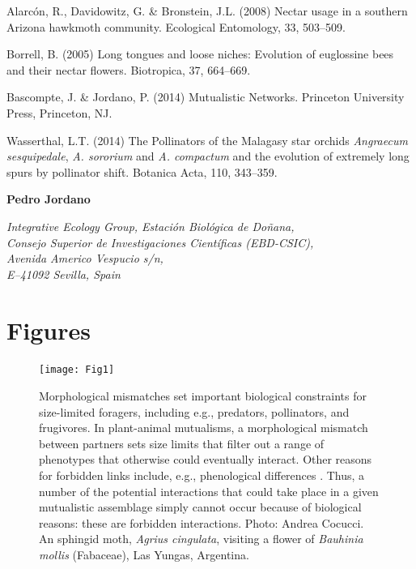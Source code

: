 \documentclass[a4paper,12pt]{article}
\begin{document}
\begin{thebibliography}{10}
Alarcón, R., Davidowitz, G. \& Bronstein, J.L. (2008) Nectar usage in a southern Arizona hawkmoth community. Ecological Entomology, 33, 503–509.

Borrell, B. (2005) Long tongues and loose niches: Evolution of euglossine bees and their nectar flowers. Biotropica, 37, 664–669.

Bascompte, J. \& Jordano, P. (2014) Mutualistic Networks. Princeton University Press, Princeton, NJ.

Wasserthal, L.T. (2014) The Pollinators of the Malagasy star orchids \textit{Angraecum sesquipedale}, \textit{A. sororium} and \textit{A. compactum} and the evolution of extremely long spurs by pollinator shift. Botanica Acta, 110, 343–359.

\end{thebibliography}


\begin{flushright}
  \noindent 
  		\textbf{Pedro Jordano }\\
  		\begin{spacing}{1.0}
		\textit{Integrative Ecology Group, Estaci\'on Biol\'ogica de Do\~nana, \\ Consejo Superior de Investigaciones Cient\'ificas (EBD-CSIC), \\ Avenida Americo Vespucio s\slash n, \\ E--41092 Sevilla, Spain}
		\end{spacing}
\end{flushright}
\newpage

\pagestyle{empty}
\section*{Figures}


\begin{figure}[h!]
  \caption{Morphological mismatches set important biological constraints for size-limited foragers, including e.g., predators, pollinators, and frugivores. In plant-animal mutualisms, a morphological mismatch between partners sets size limits that filter out a range of phenotypes that otherwise could eventually interact. Other reasons for forbidden links include, e.g., phenological differences \citep{BasJor:2014}. Thus, a number of the potential interactions that could take place in a given mutualistic assemblage simply cannot occur because of biological reasons: these are forbidden interactions. Photo: Andrea Cocucci. An sphingid moth, \textit{Agrius cingulata}, visiting a flower of \textit{Bauhinia mollis} (Fabaceae), Las Yungas, Argentina.}
  \label{Fig1}
  \begin{center}
    \texttt{[image: Fig1]}
  \end{center}
\end{figure}
\end{document}
